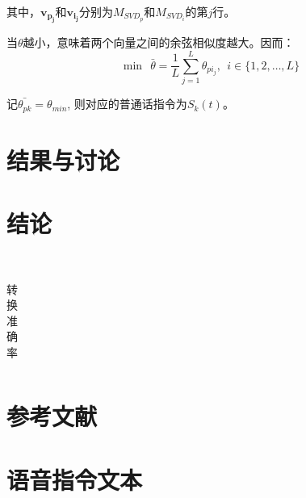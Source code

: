 \documentclass[lang=cn,cite=super]{elegantpaper}
\begin{document}
其中，$\bm{v_{p_j}}$和$\bm{v_{i_j}}$分别为$M_{SVD_p}$和$M_{SVD_i}$的第$j$行。

当$\theta$越小，意味着两个向量之间的余弦相似度越大。因而：
\begin{equation}
    \min ~~\bar{\theta} = \dfrac{1}{L} \sum_{j=1}^{L} \theta_{pi_{j}}, ~~i \in \{1,2,\ldots, L\}
\end{equation}

记$\bar{\theta_{pk}} = \theta_{min}$, 则对应的普通话指令为$S_k(t)$。
\section{结果与讨论}


\section{结论}
\begin{table}[h]
    \caption{\label{tab:3} 转换准确率}\
    \begin{center}
        \begin{tabular}{ccc}
            \hline
            \hline
        \end{tabular}
    \end{center}
\end{table}
\section{参考文献}
\appendix
\section{语音指令文本}
\label{appendix:A}
\end{document}
